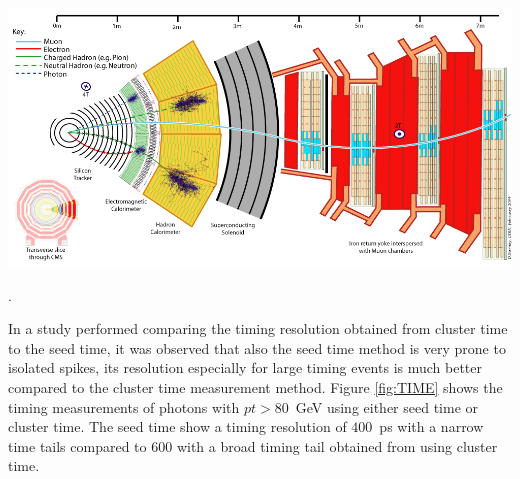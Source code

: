 \begin{center}
\centering
\includegraphics[scale=0.2]{THESISPLOTS/CMS_Slice.png}
\label{fig:spikeVsPhoton}
\end{center}.

In a study performed comparing the timing resolution obtained from cluster time to the seed time, it was observed that also the seed time method is very prone to isolated spikes, its resolution especially for large timing events is much better compared to the cluster time measurement method.
Figure \ref{fig:TIME} shows the timing measurements of photons with $pt > 80$~GeV using either seed time or cluster time. The seed time show a timing resolution of $400$~ps with a narrow time tails compared to $600$ with a broad timing tail obtained from using cluster time.

